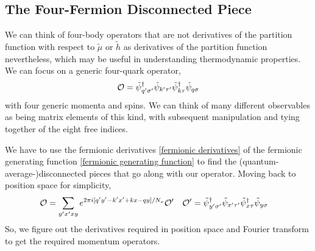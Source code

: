 \subsection{The Four-Fermion Disconnected Piece}

We can think of four-body operators that are not derivatives of the partition function with respect to $\tilde{\mu}$ or $\tilde{h}$ as derivatives of the partition function nevertheless, which may be useful in understanding thermodynamic properties.
We can focus on a generic four-quark operator,
\begin{align}
	\mathcal{O} = \tilde{\psi}{}^{\dagger}_{q'\sigma'} \tilde{\psi}_{k'\tau'} \tilde{\psi}{}^{\dagger}_{k\tau} \tilde{\psi}_{q\sigma}
\end{align}
with four generic momenta and spins.
We can think of many different observables as being matrix elements of this kind, with subsequent manipulation and tying together of the eight free indices.

We have to use the fermionic derivatives \eqref{fermionic derivatives} of the fermionic generating function \eqref{fermionic generating function} to find the (quantum-average-)disconnected pieces that go along with our operator.
Moving back to position space for simplicity,
\begin{align}
	\mathcal{O} &= \sum_{y'x'xy} e^{2\pi i [q'y' - k'x' + kx - qy]/N_x} \mathcal{O}'
	&
	\mathcal{O}' &= \tilde{\psi}{}^{\dagger}_{y'\sigma'} \tilde{\psi}_{x'\tau'} \tilde{\psi}{}^{\dagger}_{x\tau} \tilde{\psi}_{y\sigma}
\end{align}
So, we figure out the derivatives required in position space and Fourier transform to get the required momentum operators.

